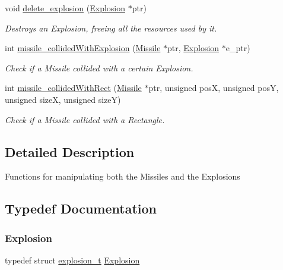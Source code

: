 \begin{DoxyCompactItemize}
void \hyperlink{group___missile_ga41c05f1f6d72a4c84b12d595b9ae8cbc}{delete\+\_\+explosion} (\hyperlink{group___missile_gab15157e0eccd9297f66644015d4966b1}{Explosion} $\ast$ptr)
\begin{DoxyCompactList}\small\item\em Destroys an Explosion, freeing all the resources used by it. \end{DoxyCompactList}\item 
int \hyperlink{group___missile_gab2d6dfae85e8db5dd6444161120f2fc1}{missile\+\_\+collided\+With\+Explosion} (\hyperlink{group___missile_ga7ea98f7c879356e5dfa41934529d86e1}{Missile} $\ast$ptr, \hyperlink{group___missile_gab15157e0eccd9297f66644015d4966b1}{Explosion} $\ast$e\+\_\+ptr)
\begin{DoxyCompactList}\small\item\em Check if a Missile collided with a certain Explosion. \end{DoxyCompactList}\item 
int \hyperlink{group___missile_gacc30474e7e5f9cf52f0b41dcc27aa231}{missile\+\_\+collided\+With\+Rect} (\hyperlink{group___missile_ga7ea98f7c879356e5dfa41934529d86e1}{Missile} $\ast$ptr, unsigned posX, unsigned posY, unsigned sizeX, unsigned sizeY)
\begin{DoxyCompactList}\small\item\em Check if a Missile collided with a Rectangle. \end{DoxyCompactList}\end{DoxyCompactItemize}


\subsection{Detailed Description}
Functions for manipulating both the Missiles and the Explosions 

\subsection{Typedef Documentation}
\hypertarget{group___missile_gab15157e0eccd9297f66644015d4966b1}{}\label{group___missile_gab15157e0eccd9297f66644015d4966b1} 
\subsubsection{\texorpdfstring{Explosion}{Explosion}}
{\footnotesize\ttfamily typedef struct \hyperlink{structexplosion__t}{explosion\+\_\+t} \hyperlink{group___missile_gab15157e0eccd9297f66644015d4966b1}{Explosion}}

